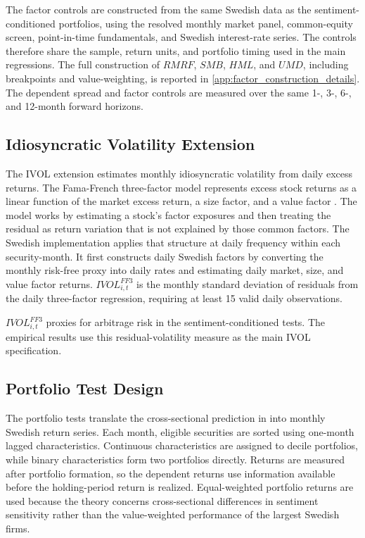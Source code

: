 \documentclass[11pt]{article}
\newcommand{\var}[1]{\ensuremath{#1}}
\begin{document}
The factor controls are constructed from the same Swedish data as the sentiment-conditioned portfolios, using the resolved monthly market panel, common-equity screen, point-in-time fundamentals, and Swedish interest-rate series. The controls therefore share the sample, return units, and portfolio timing used in the main regressions. The full construction of \var{RMRF}, \var{SMB}, \var{HML}, and \var{UMD}, including breakpoints and value-weighting, is reported in \cref{app:factor_construction_details}. The dependent spread and factor controls are measured over the same 1-, 3-, 6-, and 12-month forward horizons.

\subsection{Idiosyncratic Volatility Extension}
The IVOL extension estimates monthly idiosyncratic volatility from daily excess returns. The Fama-French three-factor model represents excess stock returns as a linear function of the market excess return, a size factor, and a value factor \citep{fama1993common}. The model works by estimating a stock's factor exposures and then treating the residual as return variation that is not explained by those common factors. The Swedish implementation applies that structure at daily frequency within each security-month. It first constructs daily Swedish factors by converting the monthly risk-free proxy into daily rates and estimating daily market, size, and value factor returns. \var{IVOL^{FF3}_{i,t}} is the monthly standard deviation of residuals from the daily three-factor regression, requiring at least 15 valid daily observations.

\var{IVOL^{FF3}_{i,t}} proxies for arbitrage risk in the sentiment-conditioned tests. The empirical results use this residual-volatility measure as the main IVOL specification.

\subsection{Portfolio Test Design}
The portfolio tests translate the cross-sectional prediction in \citet{baker2006sentiment} into monthly Swedish return series. Each month, eligible securities are sorted using one-month lagged characteristics. Continuous characteristics are assigned to decile portfolios, while binary characteristics form two portfolios directly. Returns are measured after portfolio formation, so the dependent returns use information available before the holding-period return is realized. Equal-weighted portfolio returns are used because the theory concerns cross-sectional differences in sentiment sensitivity rather than the value-weighted performance of the largest Swedish firms.
\end{document}
